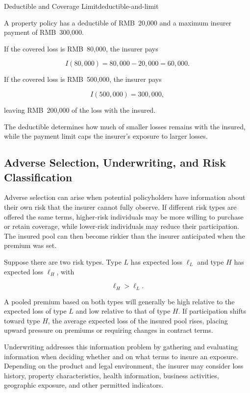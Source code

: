 \begin{example}{Deductible and Coverage Limit}{deductible-and-limit}

A property policy has a deductible of RMB~20,000 and a maximum insurer payment of RMB~300,000.

If the covered loss is RMB~80,000, the insurer pays

$$
I(80{,}000)=80{,}000-20{,}000=60{,}000.
$$

If the covered loss is RMB~500,000, the insurer pays

$$
I(500{,}000)=300{,}000,
$$

leaving RMB~200,000 of the loss with the insured.

The deductible determines how much of smaller losses remains with the insured, while the payment limit caps the insurer's exposure to larger losses.

\end{example}


\subsection{Adverse Selection, Underwriting, and Risk Classification}

Adverse selection can arise when potential policyholders have information about their own risk that the insurer cannot fully observe. If different risk types are offered the same terms, higher-risk individuals may be more willing to purchase or retain coverage, while lower-risk individuals may reduce their participation. The insured pool can then become riskier than the insurer anticipated when the premium was set.

Suppose there are two risk types. Type $L$ has expected loss $\ell_L$ and type $H$ has expected loss $\ell_H$, with

\begin{equation}
\ell_H>\ell_L.
\label{eq}
\end{equation}

A pooled premium based on both types will generally be high relative to the expected loss of type $L$ and low relative to that of type $H$. If participation shifts toward type $H$, the average expected loss of the insured pool rises, placing upward pressure on premiums or requiring changes in contract terms.

Underwriting addresses this information problem by gathering and evaluating information when deciding whether and on what terms to insure an exposure. Depending on the product and legal environment, the insurer may consider loss history, property characteristics, health information, business activities, geographic exposure, and other permitted indicators.

